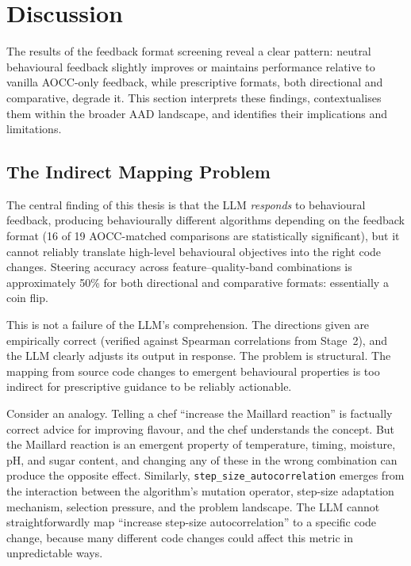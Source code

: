 
\chapter{Discussion}
\label{ch:discussion}

The results of the feedback format screening reveal a clear pattern: neutral behavioural feedback slightly improves or maintains performance relative to vanilla AOCC-only feedback, while prescriptive formats, both directional and comparative, degrade it. This section interprets these findings, contextualises them within the broader AAD landscape, and identifies their implications and limitations.

\section{The Indirect Mapping Problem}
\label{sec:disc-indirect}

The central finding of this thesis is that the LLM \emph{responds} to behavioural feedback, producing behaviourally different algorithms depending on the feedback format (16 of 19 AOCC-matched comparisons are statistically significant), but it cannot reliably translate high-level behavioural objectives into the right code changes. Steering accuracy across feature--quality-band combinations is approximately 50\% for both directional and comparative formats: essentially a coin flip.

This is not a failure of the LLM's comprehension. The directions given are empirically correct (verified against Spearman correlations from Stage~2), and the LLM clearly adjusts its output in response. The problem is structural. The mapping from source code changes to emergent behavioural properties is too indirect for prescriptive guidance to be reliably actionable.

Consider an analogy. Telling a chef ``increase the Maillard reaction'' is factually correct advice for improving flavour, and the chef understands the concept. But the Maillard reaction is an emergent property of temperature, timing, moisture, pH, and sugar content, and changing any of these in the wrong combination can produce the opposite effect. Similarly, \texttt{step\_size\_autocorrelation} emerges from the interaction between the algorithm's mutation operator, step-size adaptation mechanism, selection pressure, and the problem landscape. The LLM cannot straightforwardly map ``increase step-size autocorrelation'' to a specific code change, because many different code changes could affect this metric in unpredictable ways.

